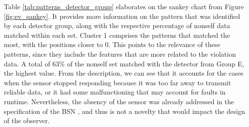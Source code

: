 Table \ref{tab:patterns_detector_group} elaborates on the sankey chart from Figure \ref{fig:ev_sankey}. It provides more information on the pattern that was identified by each detector group, along with the respective percentage of nonself data matched within each set. Cluster 1 comprises the patterns that matched the most, with the positions closer to 0. This points to the relevance of these patterns, since they include the features that are more related to the violation data. A total of 63\% of the nonself set matched with the detector from Group E, the highest value. From the description, we can see that it accounts for the cases when the sensor stopped responding because it was too far away to transmit reliable data, or it had some malfunctioning that may account for faults in runtime. Nevertheless, the absency of the sensor was already addressed in the specification of the BSN \cite{seams2018}, and thus is not a novelty that would impact the design of the observer.


